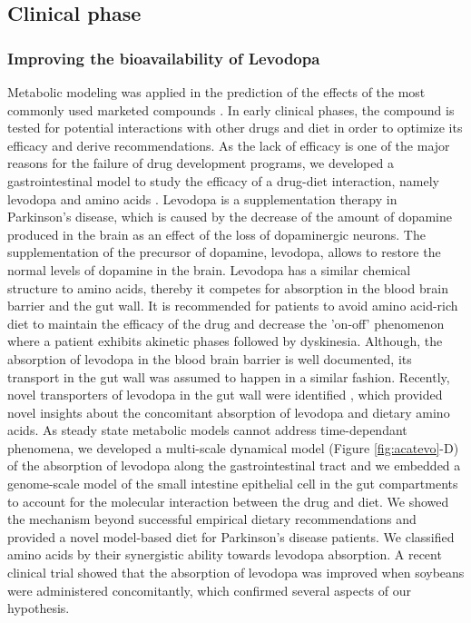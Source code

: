 \subsection{Clinical phase}
\subsubsection{Improving the bioavailability of Levodopa}
Metabolic modeling was applied in the prediction of the effects of the most commonly used marketed compounds \cite{sahoo2015modeling}. In early clinical phases, the compound is tested for potential interactions with other drugs and diet in order to optimize its efficacy and derive recommendations. As the lack of efficacy is one of the major reasons for the failure of drug development programs, we developed a gastrointestinal model to study the efficacy of a drug-diet interaction, namely levodopa and amino acids \cite{guebila2016model}. Levodopa is a supplementation therapy in Parkinson's disease, which is caused by the decrease of the amount of dopamine produced in the brain as an effect of the loss of dopaminergic neurons. The supplementation of the precursor of dopamine, levodopa, allows to restore the normal levels of dopamine in the brain. Levodopa has a similar chemical structure to amino acids, thereby it competes for absorption in the blood brain barrier and the gut wall. It is recommended for patients to avoid amino acid-rich diet to maintain the efficacy of the drug and decrease the 'on-off' phenomenon where a patient exhibits akinetic phases followed by dyskinesia. Although, the absorption of levodopa in the blood brain barrier is well documented, its transport in the gut wall was assumed to happen in a similar fashion. Recently, novel transporters of levodopa in the gut wall were identified \cite{camargo2014molecular}, which provided novel insights about the concomitant absorption of levodopa and dietary amino acids. As steady state metabolic models cannot address time-dependant phenomena, we developed a multi-scale dynamical model (Figure \ref{fig:acatevo}-D) of the absorption of levodopa along the gastrointestinal tract and we embedded a genome-scale model of the small intestine epithelial cell in the gut compartments to account for the molecular interaction between the drug and diet. We showed the mechanism beyond successful empirical dietary recommendations and provided a novel model-based diet for Parkinson's disease patients. We classified amino acids by their synergistic ability towards levodopa absorption. A recent clinical trial \cite{nagashima2016effects} showed that the absorption of levodopa was improved when soybeans were administered concomitantly, which confirmed several aspects of our hypothesis.\\
